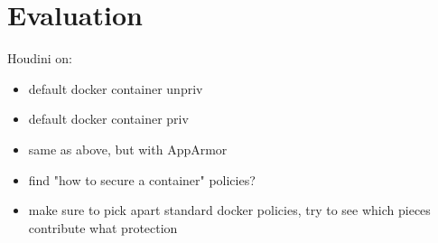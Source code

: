 \section{Evaluation}
\label{sec:evaluation}

Houdini on:
\begin{itemize}
\item default docker container unpriv
\item default docker container priv
\item same as above, but with AppArmor
\item find "how to secure a container" policies?
\item make sure to pick apart standard docker policies, try to see which pieces contribute what protection
\end{itemize}

